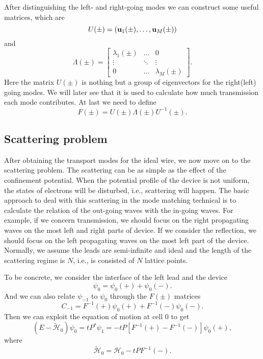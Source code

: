 \documentclass[journal]{IEEEtran}
\begin{document}
After distinguishing the left- and right-going modes we can construct some useful matrices, which are
\begin{equation}
    U(\pm)=({\bf u}_1(\pm),\dots,{\bf u}_M(\pm))
    \label{}
\end{equation}
and
\begin{equation}
    \Lambda(\pm)=\left[
        \begin{array}{ccc}
            \lambda_1(\pm) & \dots & 0 \\
            \vdots & \ddots & \vdots \\
            0 & \dots & \lambda_M(\pm)
    \end{array}\right].
    \label{}
\end{equation}
Here the matrix $U(\pm)$ is nothing but a group of eigenvectors for the right(left) going modes. We will later see that it
is used to calculate how much transmission each mode contributes. At last we need to define
\begin{equation}
    F(\pm)=U(\pm)\Lambda(\pm)U^{-1}(\pm).
    \label{}
\end{equation}

\subsection{Scattering problem}
After obtaining the transport modes for the ideal wire, we now move on to the scattering problem. The scattering can be
as simple as the effect of the confinement potential. When the potential profile of the device is not uniform, the
states of electrons will be disturbed, i.e., scattering will happen. The basic approach to deal with this scattering in
the mode matching technical \cite{BKJ:1991} is to calculate the relation of the out-going waves with the in-going waves.
For example, if we concern transmission, we should focus on the right propagating waves on the most left and right parts
of device. If we consider the reflection, we should focus on the left propagating waves on the most left part of the
device. Normally, we assume the leads are semi-infinite and ideal and the length of the scattering regime is $N$, i.e.,
is consisted of $N$ lattice points.

To be concrete, we consider the interface of the left lead and the device
\begin{equation}
    \psi_0=\psi_0(+)+\psi_0(-).
    \label{}
\end{equation}
And we can also relate $\psi_{-1}$ to $\psi_{0}$ through the $F(\pm)$ matrices
\begin{equation}
    C_{-1}=F^{-1}(+)\psi_0(+)+F^{-1}(-)\psi_0(-).
    \label{}
\end{equation}
Then we can exploit the equation of motion at cell $0$ to get
\begin{equation}
    (E-\tilde{\mathcal{H}}_0)\psi_0=tP^*\psi_1=-tP[F^{-1}(+)-F^{-1}(-)]\psi_0(+),
    \label{eq:h0}
\end{equation}
where
\begin{equation}
    \tilde{\mathcal{H}}_0=\mathcal{H}_0-tPF^{-1}(-).
    \label{}
\end{equation}
\end{document}
